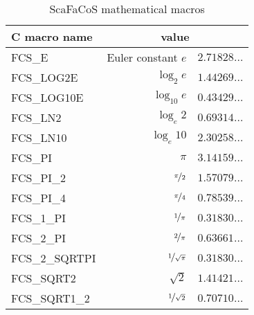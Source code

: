 \begin{table}
    \begin{center}
    \begin{tabular}{|l|r@{\,=\,}l|}
        \hline
        C macro name                    &               \multicolumn{2}{c}{value}                     \\
        \hline
        \hline
        FCS\_E                          &               Euler constant $e$         & $2.71828\hdots$  \\
        \hline
        FCS\_LOG2E                      &               $\log_2e$                  & $1.44269\hdots$  \\
        \hline
        FCS\_LOG10E                     &               $\log_{10}e$               & $0.43429\hdots$  \\
        \hline
        FCS\_LN2                        &               $\log_e2$                  & $0.69314\hdots$  \\
        \hline
        FCS\_LN10                       &               $\log_e10$                 & $2.30258\hdots$  \\
        \hline
        FCS\_PI                         &               $\pi$                      & $3.14159\hdots$  \\
        \hline
        FCS\_PI\_2                      &               $\nicefrac{\pi}{2}$        & $1.57079\hdots$  \\
        \hline
        FCS\_PI\_4                      &               $\nicefrac{\pi}{4}$        & $0.78539\hdots$  \\
        \hline
        FCS\_1\_PI                      &               $\nicefrac{1}{\pi}$        & $0.31830\hdots$  \\
        \hline
        FCS\_2\_PI                      &               $\nicefrac{2}{\pi}$        & $0.63661\hdots$  \\
        \hline
        FCS\_2\_SQRTPI                  &               $\nicefrac{1}{\sqrt{\pi}}$ & $0.31830\hdots$  \\
        \hline
        FCS\_SQRT2                      &               $\sqrt{2}$                 & $1.41421\hdots$  \\
        \hline
        FCS\_SQRT1\_2                   &               $\nicefrac{1}{\sqrt{2}}$   & $0.70710\hdots$  \\
        \hline
    \end{tabular}
    \end{center}
    \caption{ScaFaCoS mathematical macros}
    \label{tab:c_macros_mathematical}
\end{table}

